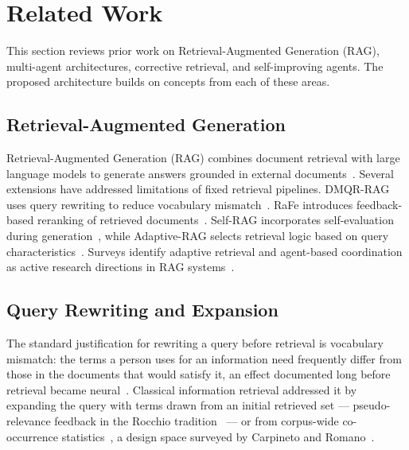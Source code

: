 \documentclass[acmsmall,review,anonymous,screen]{acmart}
\begin{document}
\section{Related Work}\label{sec:related}

This section reviews prior work on Retrieval-Augmented Generation (RAG),
multi-agent architectures, corrective retrieval, and self-improving
agents. The proposed architecture builds on concepts from each of these
areas.

\subsection{Retrieval-Augmented Generation}

Retrieval-Augmented Generation (RAG) combines document retrieval with
large language models to generate answers grounded in external
documents~\cite{lewis2020rag}. Several extensions have addressed
limitations of fixed retrieval pipelines. DMQR-RAG uses query rewriting
to reduce vocabulary mismatch~\cite{gao2024dmqr}. RaFe introduces
feedback-based reranking of retrieved documents~\cite{ma2023rafe}.
Self-RAG incorporates self-evaluation during generation~\cite{asai2024selfrag},
while Adaptive-RAG selects retrieval logic based on query
characteristics~\cite{jeong2024adaptiverag}. Surveys identify adaptive
retrieval and agent-based coordination as active research directions in
RAG systems~\cite{gao2023survey}.

\subsection{Query Rewriting and Expansion}

The standard justification for rewriting a query before retrieval is vocabulary
mismatch: the terms a person uses for an information need frequently differ from
those in the documents that would satisfy it, an effect documented long before
retrieval became neural~\cite{furnas1987vocabulary}. Classical information
retrieval addressed it by expanding the query with terms drawn from an initial
retrieved set --- pseudo-relevance feedback in the Rocchio
tradition~\cite{rocchio1971relevance} --- or from corpus-wide co-occurrence
statistics~\cite{xu1996localglobal}, a design space surveyed by Carpineto and
Romano~\cite{carpineto2012survey}.
\end{document}
